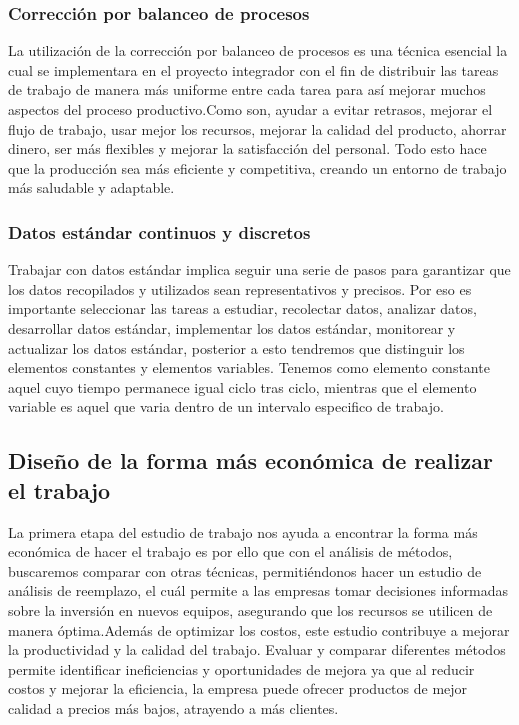     
    \subsubsection{Corrección por balanceo de procesos}
    La  utilización de la corrección por balanceo de procesos es una técnica esencial la cual se implementara en el proyecto integrador con el fin de distribuir las tareas de trabajo de manera más uniforme entre cada tarea para así mejorar muchos aspectos del proceso productivo.Como son, ayudar a evitar retrasos, mejorar el flujo de trabajo, usar mejor los recursos, mejorar la calidad del producto, ahorrar dinero, ser más flexibles y mejorar la satisfacción del personal. Todo esto hace que la producción sea más eficiente y competitiva, creando un entorno de trabajo más saludable y adaptable.
    
    \subsubsection{Datos estándar continuos y discretos}
    Trabajar con datos estándar implica seguir una serie de pasos para garantizar que los datos recopilados y utilizados sean representativos y precisos. Por eso es importante seleccionar las tareas a estudiar, recolectar datos, analizar datos, desarrollar datos estándar, implementar los datos estándar, monitorear y actualizar los datos estándar, posterior a esto tendremos que distinguir los elementos constantes y elementos variables.
    Tenemos como elemento constante aquel cuyo tiempo permanece igual ciclo tras ciclo, mientras que el elemento variable es aquel que varia dentro de un intervalo especifico de trabajo.
    
    \subsection{Diseño de la forma más económica de realizar el trabajo}
    La primera etapa del estudio de trabajo nos ayuda a encontrar la forma más económica de hacer el trabajo es por ello que con el análisis de métodos, buscaremos comparar con otras técnicas, permitiéndonos hacer un estudio de análisis de reemplazo, el cuál permite a las empresas tomar decisiones informadas sobre la inversión en nuevos equipos, asegurando que los recursos se utilicen de manera óptima.Además de optimizar los costos, este estudio contribuye a mejorar la productividad y la calidad del trabajo. Evaluar y comparar diferentes métodos permite identificar ineficiencias y oportunidades de mejora ya que al reducir costos y mejorar la eficiencia, la empresa puede ofrecer productos de mejor calidad a precios más bajos, atrayendo a más clientes.
    
